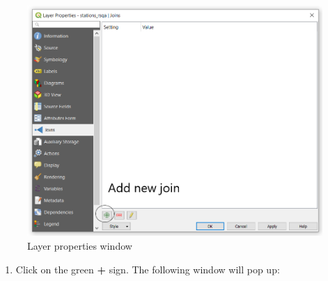 \documentclass[]{book}
\providecommand{\tightlist}{%
  \setlength{\itemsep}{0pt}\setlength{\parskip}{0pt}}
\theoremstyle{definition}
\theoremstyle{definition}
\theoremstyle{definition}
\theoremstyle{remark}
\begin{document}
\begin{figure}

{\centering \includegraphics[width=13.24in]{figures/Joins_Dialog_Box} 

}

\caption{Layer properties window}\label{fig:unnamed-chunk-14}
\end{figure}

\begin{enumerate}
\def\labelenumi{\arabic{enumi}.}
\setcounter{enumi}{1}
\tightlist
\item
  Click on the green \textbf{+} sign. The following window will pop up:
\end{enumerate}
\end{document}
